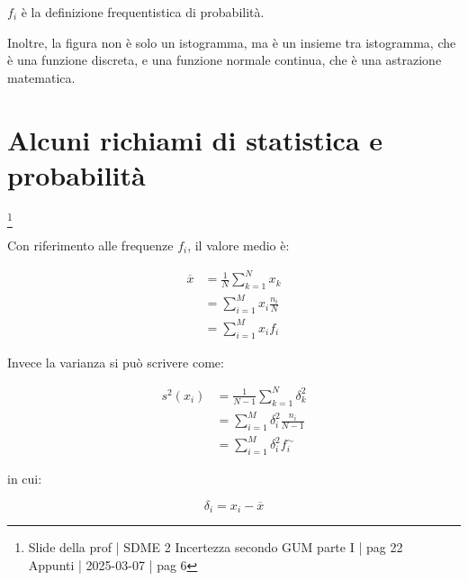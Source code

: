 $f_i$ è la definizione frequentistica di probabilità. \newline 

Inoltre, la figura non è solo un istogramma, 
ma è un insieme tra istogramma, che è una funzione discreta, 
e una funzione normale continua, che è una astrazione matematica. \newline 
 
\newpage 

\section{Alcuni richiami di statistica e probabilità}
\footnote{Slide della prof | SDME 2 Incertezza secondo GUM parte I | pag 22 \\  
Appunti | 2025-03-07 | pag 6}

Con riferimento alle frequenze $f_i$, il valore medio è: 

{
    \Large 
    \begin{equation}
        \begin{split}
        \overline{x}
        &= 
        \frac{1}{N}
        \sum_{k = 1}^{N}
        x_k 
        \\
        &=
        \sum_{i = 1}^{M}
        x_i 
        \frac{n_i}{N} 
        \\ 
        &= 
        \sum_{i = 1}^{M}
        x_i f_i
        \end{split}
    \end{equation}
}

Invece la varianza si può scrivere come: 

{
    \Large 
    \begin{equation}
        \begin{split}
            s^{2} (x_i) 
            &= 
            \frac{1}{N - 1}
            \sum_{k = 1}^{N}
            \delta^{2}_k
            \\ 
            &= 
            \sum_{i = 1}^{M} 
            \delta^{2}_i 
            \frac{n_i}{N - 1}
            \\ 
            &= 
            \sum_{i = 1}^{M} 
            \delta^{2}_i 
            f^{\sim}_i
        \end{split}
    \end{equation}
}

in cui: 

{
    \Large 
    \begin{equation}
        \delta_i = x_i - \overline{x}
    \end{equation}
}

